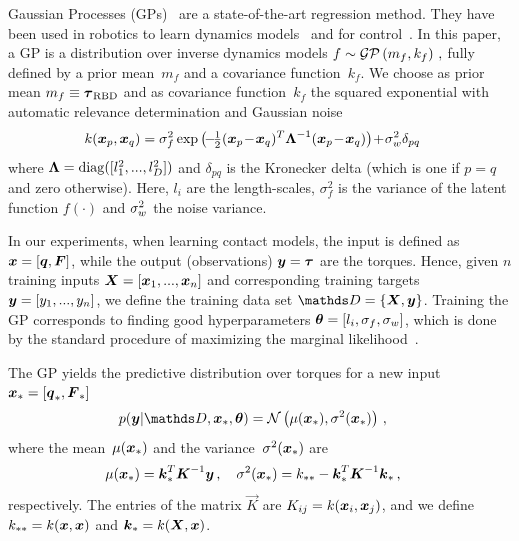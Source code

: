 Gaussian Processes (GPs)~\cite{Rasmussen2006} are a state-of-the-art regression
method. They have been used in robotics to learn dynamics
models~\cite{Deisenroth2012} and for control~\cite{Deisenroth2014}. In this
paper, a GP is a distribution over inverse dynamics models \mbox{$f \sim \mathcal{GP}
\left( m_f,k_f \right) \,,$} fully defined by a prior mean~$m_f$ and a
covariance function~$k_f$. We choose as prior mean $m_f \equiv
\boldsymbol{\tau}_\text{RBD}$ and as covariance function~$k_f$ the squared exponential
with automatic relevance determination and Gaussian noise
\begin{align*}
	{k(\vec x_p,\vec x_q)} &= \sigma_f^2\exp\left(\!-\!\tfrac{1}{2}(\vec x_p\! -\!\vec x_q)^T {\mat \Lambda\inv} (\vec x_p \!-\! \vec x_q)\right) \!+\! \sigma_\noise^2\delta_{pq}
\end{align*}
where ${\boldsymbol \Lambda}=\operatorname{\mathrm{diag}}([l^2_1,...,l^2_D])$ and $\delta_{pq}$ is the
Kronecker delta (which is one if $p=q$ and zero otherwise). Here, $l_i$ are the
length-scales, $\sigma^2_f$ is the variance of the latent function $f(\cdot)$
and $\sigma^2_w$ the noise variance. 

In our experiments, when learning contact models, the input is defined as
$\boldsymbol{x} = [\boldsymbol q,\boldsymbol{F}]$, while the output (observations) $\boldsymbol{y} =
\boldsymbol{\tau}$ are the torques. Hence, given $n$ training inputs $\boldsymbol
X=[\boldsymbol{x}_1,...,\boldsymbol{x}_n]$ and corresponding training targets $\boldsymbol
y=[ y_1,..., y_n]$, we define the training data set $\dataset = \{\mat X,\mat
y\}$. Training the GP corresponds to finding good hyperparameters $\boldsymbol{\theta} =
[l_i, \sigma_f, \sigma_w]$, which is done by the standard procedure of
maximizing the marginal likelihood~\cite{Rasmussen2006}.   

The GP yields the predictive distribution over torques for a new input $\boldsymbol{x}_* = [\boldsymbol{q}_*, \boldsymbol F_*]$
\begin{align}
	&\prob(\vec y|\dataset,\parameters_*,\vec \theta) = \gauss{\mu(\parameters_*)}{\sigma^2(\parameters_*)}\,, 
	\label{eq:one-step prediction distr}
\end{align}
where the mean~$\mu(\boldsymbol{x}_*)$ and the variance~$\sigma^2(\boldsymbol{x}_*)$ are 
\begin{align}
	&\mu(\boldsymbol{x}_*) = \boldsymbol{k}^T_*\boldsymbol{K}^{-1} \boldsymbol y\,,\quad \sigma^2(\boldsymbol{x}_*) = k_{**}-\boldsymbol{k}^T_*\boldsymbol K^{-1}\boldsymbol{k}_*\,,
	\label{eq:one-step prediction mean and covariance}
\end{align}
respectively. The entries of the matrix $\vec K$ are  $K_{ij}=
k(\boldsymbol{x}_i,\boldsymbol{x}_j)$, and we define
$k_{**}=k(\boldsymbol{x},\boldsymbol{x})$ and $\boldsymbol{k}_{*}=k(\boldsymbol{X},\boldsymbol{x})$.

